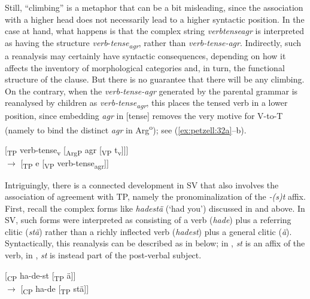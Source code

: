 \documentclass[output=paper,colorlinks,citecolor=brown,draft,draftmode]{langscibook}
\begin{document}
Still, “climbing” is a metaphor that can be a bit misleading, since the association with a higher head does not necessarily lead to a higher syntactic position. In the case at hand, what happens is that the complex string \textit{verbtenseagr} is interpreted as having the structure \textit{verb}\nobreakdash-\textit{tense\textsubscript{agr}}, rather than \textit{verb-tense-agr}. Indirectly, such a reanalysis may certainly have syntactic consequences, depending on how it affects the inventory of morphological categories and, in turn, the functional structure of the clause. But there is no guarantee that there will be any climbing. On the contrary, when the \textit{verb-tense-agr} generated by the parental grammar is reanalysed by children as \textit{verb-tense\textsubscript{agr}}, this places the tensed verb in a lower position, since embedding \textit{agr} in [tense] removes the very motive for V-to-T (namely to bind the distinct \textit{agr} in Arg\textsuperscript{o}); see (\ref{ex:petzell:32a}–b).


\ea\label{ex:petzell:32}
\ea\label{ex:petzell:32a}[\textsubscript{TP} {verb}-{tense}\textsubscript{v} [\textsubscript{ArgP} {agr} [\textsubscript{VP} t\textsubscript{v}]]] \\
\ex\label{ex:petzell:32b}  $\to$ [\textsubscript{TP} e [\textsubscript{VP} {verb-tense\textsubscript{agr}}]]
\z
\z


Intriguingly, there is a connected development in SV that also involves the association of agreement with TP, namely the pronominalization of the \textit{-(s)t} affix. First, recall the complex forms like \textit{hadestä} (‘had you’) discussed in  and  above. In SV, such forms were interpreted as consisting of a verb (\textit{hade}) plus a referring clitic (\textit{stä}) rather than a richly inflected verb (\textit{hadest}) plus a general clitic (\textit{ä}). Syntactically, this reanalysis can be described as in  below; in , \textit{st} is an affix of the verb, in , \textit{st} is instead part of the post-verbal subject.


\ea\label{ex:petzell:33}
\ea\label{ex:petzell:33a}  [\textsubscript{CP} {ha-de-st} [\textsubscript{TP} {ä}]]\\
\ex\label{ex:petzell:33b}{}  $\to$ [\textsubscript{CP} {ha-de} [\textsubscript{TP} {stä}]]
\z
\z
\end{document}
